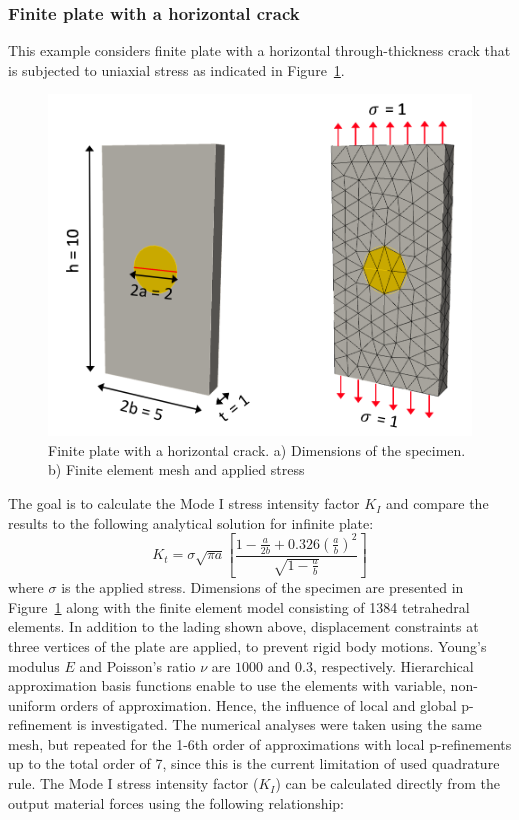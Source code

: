 \documentclass[11pt]{acmeArticle}
\numberwithin{equation}{section}
\begin{document}
\subsubsection{Finite plate with a horizontal crack}\label{sec:plate_section}
This example considers finite plate with a horizontal through-thickness crack that is subjected to uniaxial stress as indicated in Figure~\ref{fig:plate_load_mesh}. 
\begin{figure}
	\centering
	\includegraphics[width=0.5\linewidth]{Figures/plate_load_mesh.png}
	\caption{Finite plate with a horizontal crack. a) Dimensions of the specimen. b) Finite element mesh and applied stress}
	\label{fig:plate_load_mesh}
\end{figure}
The goal is to calculate the Mode I stress intensity factor $ K_I $ and compare the results to the following analytical solution \citep{rooke1976compendium} for infinite plate:
\begin{equation}\label{eq:frac_analytical}
K_t=\sigma \sqrt{\pi a} \left[  \frac{1 - \frac{a}{2b} + 0.326 (\frac{a}{b})^2 }{\sqrt{1-\frac{a}{b}}}  \right]
\end{equation}
where $\sigma $ is the applied stress. 
Dimensions of the specimen are presented in Figure~\ref{fig:plate_load_mesh} along with the finite element model consisting of 1384 tetrahedral elements. 
In addition to the lading shown above, displacement constraints at three vertices of the plate are applied, to prevent rigid body motions. 
Young's modulus $E$ and Poisson's ratio $\nu$ are $1000$ and $0.3$, respectively. 
Hierarchical approximation basis functions enable to use the elements with variable, non-uniform orders of approximation. 
Hence, the influence of local and global p-refinement is investigated. 
The numerical analyses were taken using the same mesh, but repeated for the 1-6th order of approximations with local p-refinements up to the total order of 7, since this is the current limitation of used quadrature rule. 
The Mode I stress intensity factor ($K_I$) can be calculated directly from the output material forces using the following relationship: 
\end{document}
